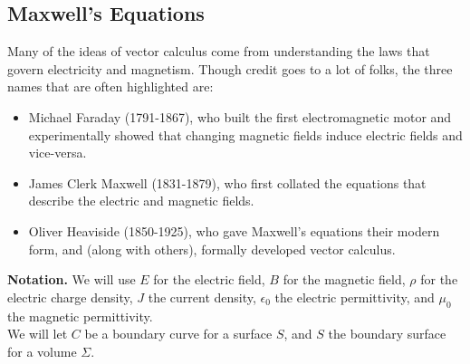 \subsection{Maxwell's Equations}

Many of the ideas of vector calculus come from understanding the laws that govern electricity and magnetism. Though credit goes to a lot of folks, the three names that are often highlighted are:
\begin{itemize}
    \item Michael Faraday (1791-1867), who built the first electromagnetic motor and experimentally showed that changing magnetic fields induce electric fields and vice-versa.
    \item James Clerk Maxwell (1831-1879), who first collated the equations that describe the electric and magnetic fields.
    \item Oliver Heaviside (1850-1925), who gave Maxwell’s equations their modern form, and (along with others), formally developed vector calculus.
\end{itemize}

\newpage

\textbf{Notation.} We will use \(E\) for the electric field, \(B\) for the magnetic field, \(\rho\) for the electric charge density, \(J\) the current density, \(\epsilon_0\) the electric permittivity, and \(\mu_0\) the magnetic permittivity. \\

We will let \(C\) be a boundary curve for a surface \(S\), and \(S\) the boundary surface for a volume \(\Sigma\). \\

\vspace*{-1.5em}

